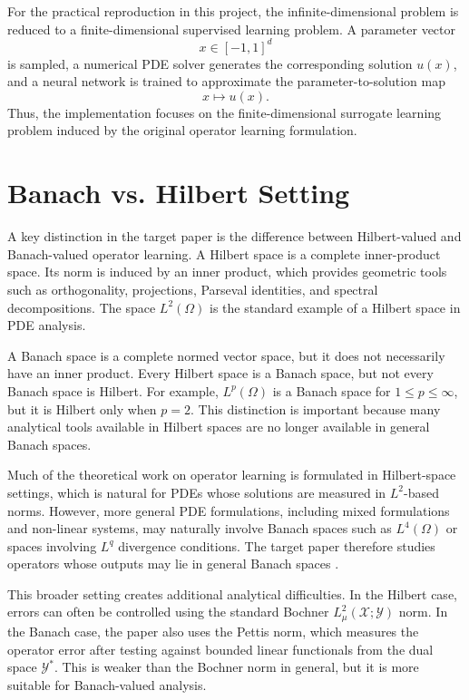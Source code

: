 For the practical reproduction in this project, the infinite-dimensional problem is reduced to a finite-dimensional supervised learning problem. A parameter vector
\[
    x \in [-1,1]^d
\]
is sampled, a numerical PDE solver generates the corresponding solution $u(x)$, and a neural network is trained to approximate the parameter-to-solution map
\[
    x \mapsto u(x).
\]
Thus, the implementation focuses on the finite-dimensional surrogate learning problem induced by the original operator learning formulation.

\section{Banach vs. Hilbert Setting}

A key distinction in the target paper is the difference between Hilbert-valued and Banach-valued operator learning. A Hilbert space is a complete inner-product space. Its norm is induced by an inner product, which provides geometric tools such as orthogonality, projections, Parseval identities, and spectral decompositions. The space $L^2(\Omega)$ is the standard example of a Hilbert space in PDE analysis.

A Banach space is a complete normed vector space, but it does not necessarily have an inner product. Every Hilbert space is a Banach space, but not every Banach space is Hilbert. For example, $L^p(\Omega)$ is a Banach space for $1 \leq p \leq \infty$, but it is Hilbert only when $p=2$. This distinction is important because many analytical tools available in Hilbert spaces are no longer available in general Banach spaces.

Much of the theoretical work on operator learning is formulated in Hilbert-space settings, which is natural for PDEs whose solutions are measured in $L^2$-based norms. However, more general PDE formulations, including mixed formulations and non-linear systems, may naturally involve Banach spaces such as $L^4(\Omega)$ or spaces involving $L^q$ divergence conditions. The target paper therefore studies operators whose outputs may lie in general Banach spaces \cite{adcock2024holomorphic}.

This broader setting creates additional analytical difficulties. In the Hilbert case, errors can often be controlled using the standard Bochner
$L^2_\mu(\mathcal{X};\mathcal{Y})$ norm. In the Banach case, the paper also uses the Pettis norm, which measures the operator error after testing against bounded linear functionals from the dual space $\mathcal{Y}^\ast$. This is weaker than the Bochner norm in general, but it is more suitable for Banach-valued analysis.

